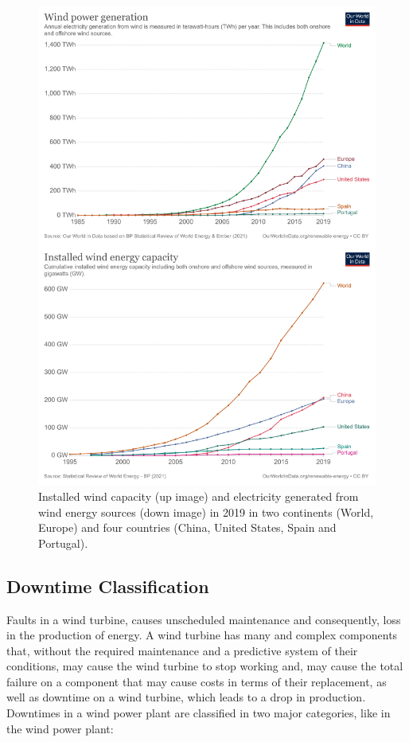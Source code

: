\begin{figure}[htbp]
	\centering
	\includegraphics[width=\textwidth]{Chapters/Figures/background_fig6.PNG}
	\caption{Installed wind capacity (up image) and electricity generated from wind energy sources (down image) in 2019 in two continents (World, Europe) and four countries (China, United States, Spain and Portugal). \cite{OLD_33_GENERAL} }
	\label{fig:Figuras_Tree_silhouettes-vectorial}
\end{figure}


\subsection{Downtime Classification} 
\label{sub:if_you_use_this_template} 

Faults in a wind turbine, causes unscheduled maintenance and consequently, loss in the production of energy. A wind turbine has many and complex components that, without the required maintenance and a predictive system of their conditions, may cause the wind turbine to stop working and, may cause the total failure on a component that may cause costs in terms of their replacement, as well as downtime on a wind turbine, which leads to a drop in production.
Downtimes in a wind power plant are classified in two major categories, like in the wind power plant:
 
